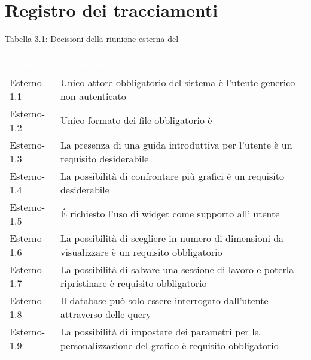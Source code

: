 \section{Registro dei tracciamenti}
{
Tabella 3.1: Decisioni della riunione esterna del \Data{}
\renewcommand{\arraystretch}{1.5}
\centering
\begin{longtable}{C{3cm} C{9cm}}
\textcolor{white}{\textbf{Codice}}&
\textcolor{white}{\textbf{Decisione}}\\	
\endhead
		
Esterno-1.1 & Unico attore obbligatorio del sistema è l'utente generico non autenticato\\

Esterno-1.2 & Unico formato dei file obbligatorio è \\

Esterno-1.3 & La presenza di una guida introduttiva per l'utente è un requisito desiderabile\\

Esterno-1.4 & La possibilità di confrontare più grafici è un requisito desiderabile\\

Esterno-1.5 & \'E richiesto l'uso di widget come supporto all' utente\\

Esterno-1.6 & La possibilità di scegliere in numero di dimensioni da visualizzare è un requisito obbligatorio\\

Esterno-1.7 & La possibilità di salvare una sessione di lavoro e poterla ripristinare è requisito obbligatorio\\

Esterno-1.8 & Il database può solo essere interrogato dall'utente attraverso delle query\\

Esterno-1.9 & La possibilità di impostare dei parametri per la personalizzazione del grafico è requisito obbligatorio\\
		
\end{longtable}
}
